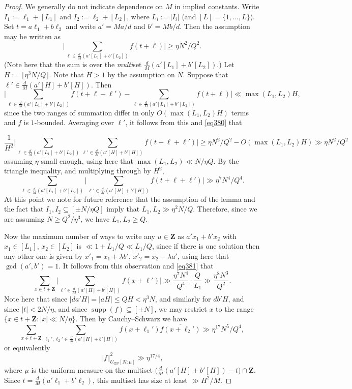 \documentclass[11pt,reqno]{amsart}
\numberwithin{equation}{section}
\theoremstyle{definition}
\theoremstyle{remark}
\newcommand{\on}{\operatorname}
\renewcommand{\le}{\leqslant}
\renewcommand{\ge}{\geqslant}
\newcommand\Z{\mathbf{Z}}
\newcommand\GP{\operatorname{GP}}
\begin{document}
\begin{proof} We generally do not indicate dependence on $M$ in implied constants.
Write $I_1 := \ell_1 + [L_1]$ and $I_2 := \ell_2 + [L_2]$, where $L_i := |I_i|$ (and $[L] = \{1,\dots, L\}$). Set $t = a \ell_1 + b\ell_2$ and write $a' = Ma/d$ and $b' = Mb/d$. Then the assumption may be written as
\begin{equation}\label{eq380} \Big|\sum_{\ell \in  \frac{d}{M}(a'[L_1] + b'[L_2])}f(t + \ell)\Big|\ge \eta N^2/Q^2.\end{equation} (Note here that the sum is over the \emph{multi}set $\frac{d}{M}(a'[L_1] + b'[L_2])$.)
Let $H := \lfloor\eta^{3}N/Q\rfloor$. Note that $H > 1$ by the assumption on $N$. 
Suppose that $\ell' \in \frac{d}{M}(a'[H] + b'[H])$. Then 
\[ \Big|\sum_{\ell \in  \frac{d}{M}(a' [L_1] + b' [L_2])}f(t + \ell + \ell') - \sum_{\ell \in  \frac{d}{M}(a'[L_1] + b'[L_2])}f(t + \ell)\Big| \ll \max(L_1, L_2) H,\] since the two ranges of summation differ in only $O(\max(L_1, L_2) H)$ terms and $f$ is $1$-bounded. Averaging over $\ell'$, it follows from this and \cref{eq380} that 

\[\frac{1}{H^2} \Big| \sum_{\ell \in  \frac{d}{M}(a' [L_1] + b'[L_2])} \sum_{\ell'\in  \frac{d}{M}(a' [H] + b'[H])}f(t + \ell + \ell')\Big|\ge \eta N^2/Q^2 - O(\max(L_1, L_2) H) \gg \eta N^2/Q^2\] assuming $\eta$ small enough, using here that $\max(L_1, L_2) \ll N/\eta Q$.
By the triangle inequality, and multiplying through by $H^2$, 
\begin{equation}\label{eq381}\sum_{\ell \in  \frac{d}{M}(a' [L_1] + b'[L_2])}\Big|\sum_{\ell'\in  \frac{d}{M}(a' [H] + b'[H])}f(t + \ell + \ell')\Big|\gg \eta^{7}N^4/Q^4.\end{equation} 
At this point we note for future reference that the assumption of the lemma and the fact that $I_1, I_2 \subseteq [\pm N/\eta Q]$ imply that $L_1, L_2 \gg \eta^2 N/Q$. Therefore, since we are assuming $N \ge Q^2/\eta^3$, we have $L_1, L_2 \ge Q$. 


Now the maximum number of ways to write any $u \in \Z$ as $a'x_1 + b'x_2$ with $x_1 \in [L_1]$, $x_2 \in [L_2]$ is $\ll 1 + L_1/Q \ll L_1/Q$, since if there is one solution then any other one is given by $x'_1 = x_1 + \lambda b'$, $x'_2 = x_2 - \lambda a'$, using here that $\gcd(a', b') = 1$. It follows from this observation and \cref{eq381} that
\[\sum_{x \in t + \Z }\Big|\sum_{\ell'\in  \frac{d}{M}(a'[H] + b'[H])}f(x + \ell')\Big|\gg 
\frac{\eta^{7}N^4}{Q^4} \cdot \frac{Q}{L_1} \gg \frac{\eta^8 N^3}{Q^2}.\]
Note here that since $|da' H| = |aH| \le QH < \eta^3 N$, and similarly for $db'H$, and since $|t| < 2N/\eta$, and since $\on{supp}(f) \subseteq[\pm N]$, we may restrict $x$ to the range $\{ x \in t + \Z : |x| \ll N/\eta\}$. Then by Cauchy--Schwarz we have
\[\sum_{x\in t + \Z}\sum_{\ell_1',\ell_2'\in \frac{d}{M}(a'[H] + b'[H])}f( x + \ell_1')\overline{f( x + \ell_2')}\gg \eta^{17}N^5/Q^4,\] or equivalently
\begin{equation} \label{eq344} \Vert f \Vert^2_{U_{\GP}[N; \mu]} \gg \eta^{17/4},\end{equation}
where $\mu$ is the uniform measure on the multiset $\big( \frac{d}{M}(a'[H] + b'[H]) - t\big)\cap \Z$. Since $t = \frac{d}{M} (a'\ell_1 + b'\ell_2)$, this multiset has size at least $\gg H^2/M$.


\end{proof}
\end{document}
